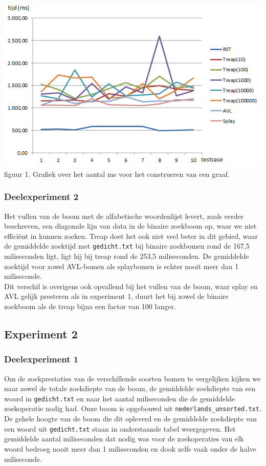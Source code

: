 \documentclass[a4paper,10pt]{article}
\begin{document}
\begin{center}
\includegraphics[scale=0.75]{fill.png}
figuur 1. Grafiek over het aantal ms voor het construeren van een graaf.
\end{center}

\subsubsection{Deelexperiment 2}
Het vullen van de boom met de alfabetische woordenlijst levert, zoals eerder beschreven, een diagonale lijn van data in de binaire zoekboom op, waar we niet efficiënt in kunnen zoeken. Treap doet het ook niet veel beter in dit gebied, waar de gemiddelde zoektijd met \texttt{gedicht.txt} bij binaire zoekbomen rond de 167,5 miliseconden ligt, ligt hij bij treap rond de 253,5 miliseconden. De gemiddelde zoektijd voor zowel AVL-bomen als splaybomen is echter nooit meer dan 1 miliseconde. \\
Dit verschil is overigens ook opvallend bij het vullen van de boom, waar splay en AVL gelijk presteren als in experiment 1, duurt het bij zowel de binaire zoekboom als de treap bijna een factor van 100 langer.

\subsection{Experiment 2}
\subsubsection{Deelexperiment 1}
Om de zoekprestaties van de verschillende soorten bomen te vergelijken kijken we naar zowel de totale zoekdiepte van de boom, de gemiddelde zoekdiepte van een woord in \texttt{gedicht.txt} en naar het aantal miliseconden die de gemiddelde zoekoperatie nodig had. Onze boom is opgebouwd uit \texttt{nederlands\_unsorted.txt}.
De gehele hoogte van de boom die dit opleverd en de gemiddelde zoekdiepte van een woord uit \texttt{gedicht.txt} staan in onderstaande tabel weergegeven. Het gemiddelde aantal miliseconden dat nodig was voor de zoekoperaties van elk woord bedroeg nooit meer dan 1 miliseconden en dook zelfs vaak onder de halve miliseconde.
\end{document}
